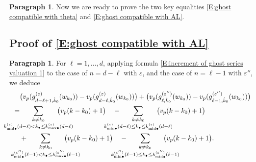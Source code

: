 \documentclass[12pt]{amsart}
\theoremstyle{definition}
\newtheorem{para}[subsection]{Paragraph}
\numberwithin{equation}{subsection}
\def\ZZ{\mathbb{Z}}
\newcommand{\midd}{\mathrm{mid}}
\begin{document}
\begin{para}
\label{P:para_135}
Now we are ready to prove the two key equalities \eqref{E:ghost compatible with theta} and \eqref{E:ghost compatible with AL}.
\end{para}


\subsection{Proof of \eqref{E:ghost compatible with AL}}
\label{S:proof of ghost compatible with AL}
\begin{para}
\label{P:para_136}
For $\ell = 1, \dots, d$, applying formula \eqref{E:increment of ghost series valuation 1} to the case of $n=d-\ell$ with $\varepsilon$, and the case of $n=\ell-1$ with $\varepsilon''$, we deduce 
\begin{align}
\label{E:ghost compatible with AL first step}
&\big(v_p(g_{d-\ell+1, \hat k_0}^{(\varepsilon)}(w_{k_0})) - v_p(g_{d-\ell, \hat k_0}^{(\varepsilon)}(w_{k_0}))\big) + \big(v_p(g_{\ell, \hat k_0}^{(\varepsilon'')}(w_{k_0})) - v_p(g_{\ell-1, \hat k_0}^{(\varepsilon'')}(w_{k_0}))\big)
\\
\nonumber
=&
\hspace{-25pt}
\sum_{\substack{k\neq k_0 \\
k^{(\varepsilon)}_{\midd\bullet}(d-\ell) < k_\bullet \leq k^{(\varepsilon)}_{{\max}\bullet}(d-\ell)}}
\hspace{-25pt}\big( v_p(k-k_0)+1 \big)\quad -  \hspace{-25pt} \sum_{\substack{k\neq k_0 \\
k^{(\varepsilon)}_{{\min}\bullet}(d-\ell) \leq  k_\bullet \leq k^{(\varepsilon)}_{{\midd}\bullet}(d-\ell)}}
\hspace{-25pt}\big( v_p(k-k_0)+1 \big)\\ \nonumber
&+
\hspace{-25pt}
\sum_{\substack{k\neq k_0 \\
k^{(\varepsilon'')}_{\midd\bullet}(\ell-1) < k_\bullet \leq k^{(\varepsilon'')}_{{\max}\bullet}(\ell-1)}}
\hspace{-25pt}\big( v_p(k-k_0)+1 \big)\quad -  \hspace{-25pt} \sum_{\substack{k\neq k_0 \\
k^{(\varepsilon'')}_{{\min}\bullet}(\ell-1) \leq k_\bullet \leq k^{(\varepsilon'')}_{{\midd}\bullet}(\ell-1)}}
\hspace{-25pt}\big( v_p(k-k_0)+1 \big).

\end{align}
\end{para}
\end{document}
